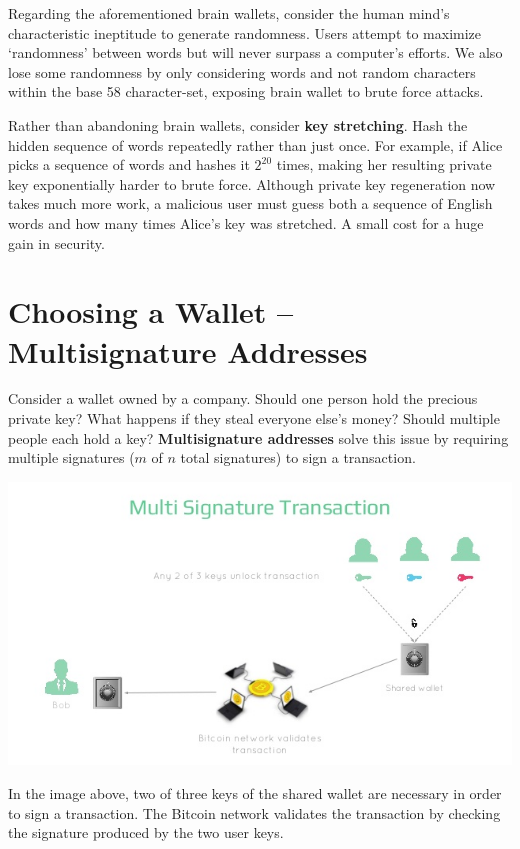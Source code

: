 \documentclass[11pt]{article}
\begin{document}
    Regarding the aforementioned brain wallets, consider the human mind's characteristic ineptitude to generate randomness. Users attempt to maximize `randomness' between words but will never surpass a computer's efforts. We also lose some randomness by only considering words and not random characters within the base 58 character-set, exposing brain wallet to brute force attacks.
    
    Rather than abandoning brain wallets, consider \textbf{key stretching}. Hash the hidden sequence of words repeatedly rather than just once. For example, if Alice picks a sequence of words and hashes it $2^{20}$ times, making her resulting private key exponentially harder to brute force. Although private key regeneration now takes much more work, a malicious user must guess both a sequence of English words and how many times Alice's key was stretched. A small cost for a huge gain in security.
    
    \section*{Choosing a Wallet -- Multisignature Addresses}
    
    Consider a wallet owned by a company. Should one person hold the precious private key? What happens if they steal everyone else's money? Should multiple people each hold a key? \textbf{Multisignature addresses} solve this issue by requiring multiple signatures ($m$ of $n$ total signatures) to sign a transaction.
    
   \includegraphics[scale=0.6]{multisig}

    In the image above, two of three keys of the shared wallet are necessary in order to sign a transaction. The Bitcoin network validates the transaction by checking the signature produced by the two user keys.
    
\end{document}
